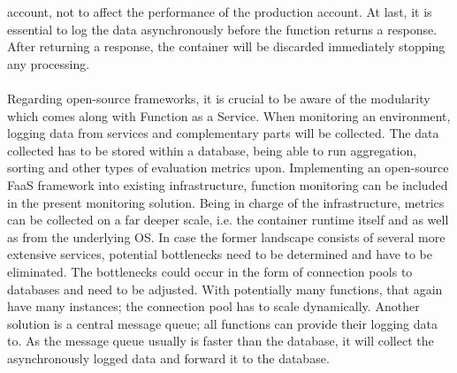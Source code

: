 \documentclass[a4paper,11pt, pagesize]{scrartcl}
\begin{document}
\begin{spacing}{1.2}
account, not to affect the performance of the production account. At last, it is essential to log the data asynchronously before the function returns a response. After returning a response, the container will be discarded immediately stopping any processing.\\\\ Regarding open-source frameworks, it is crucial to be aware of the modularity which comes along with Function as a Service. When monitoring an environment, logging data from services and complementary parts will be collected. The data collected has to be stored within a database, being able to run aggregation, sorting and other types of evaluation metrics upon. Implementing an open-source FaaS framework into existing infrastructure, function monitoring can be included in the present monitoring solution. Being in charge of the infrastructure, metrics can be collected on a far deeper scale, i.e. the container runtime itself and as well as from the underlying OS. In case the former landscape consists of several more extensive services, potential bottlenecks need to be determined and have to be eliminated. The bottlenecks could occur in the form of connection pools to databases and need to be adjusted. With potentially many functions, that again have many instances; the connection pool has to scale dynamically. Another solution is a central message queue; all functions can provide their logging data to. As the message queue usually is faster than the database, it will collect the asynchronously logged data and forward it to the database.

\end{spacing}
\end{document}
